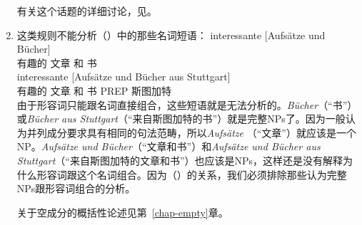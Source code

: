 \begin{enumerate}
有关这个话题的详细讨论，见。\nocite{MuellerLehrbuch1}

\item %

这类规则不能分析（）中的那些名词短语：
\eal
\ex 
\gll interessante [Aufsätze und Bücher]\\
     有趣的 \spacebr{}文章 和 书\\
\ex 
\gll interessante [Aufsätze und Bücher aus Stuttgart]\\
     有趣的 \spacebr{}文章 和 书 PREP 斯图加特\\
\zl
由于形容词只能跟名词直接组合，这些短语就是无法分析的。\emph{Bücher}（“书”）或\emph{Bücher aus Stuttgart}（“来自斯图加特的书”）就是完整NPs了。因为一般认为并列成分要求具有相同的句法范畴，所以\emph{Aufsätze} （“文章”）就应该是一个NP。\emph{Aufsätze und Bücher}（“文章和书”）和\emph{Aufsätze und Bücher aus
  Stuttgart}（“来自斯图加特的文章和书”）也应该是NPs，这样还是没有解释为什么形容词跟这个名词组合。因为（）的关系，我们必须排除那些认为完整NPs跟形容词组合的分析。

关于空成分的概括性论述见第~\ref{chap-empty}章。


\end{enumerate}
